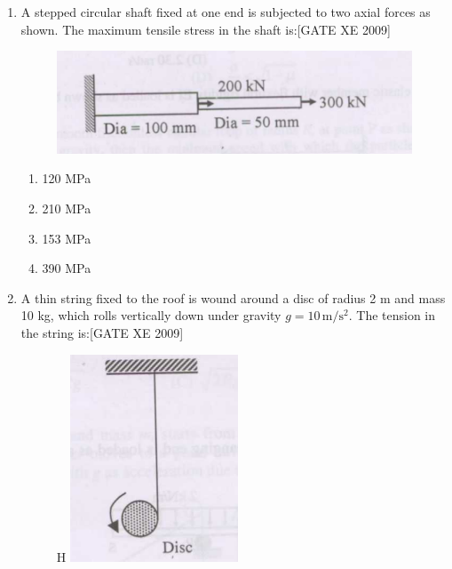 \documentclass[journal,12pt,onecolumn]{IEEEtran}
\theoremstyle{remark}
\begin{document}
\begin{enumerate}
\item A stepped circular shaft fixed at one end is subjected to two axial forces as shown. The maximum tensile stress in the shaft is:\hfill[GATE XE 2009]

\begin{figure}[H]
    \centering
    \includegraphics[width=0.5\linewidth]{figs/fig18.png}
    \caption*{}
    \label{fig:Q 77}
\end{figure}
   

\begin{multicols}{2}
\begin{enumerate}
    \item 120 MPa
    \item 210 MPa
    \item 153 MPa
    \item 390 MPa
\end{enumerate}
\end{multicols}



\item A thin string fixed to the roof is wound around a disc of radius 2 m and mass 10 kg, which rolls vertically down under gravity $g=10\,\mathrm{m/s^2}$. The tension in the string is:\hfill[GATE XE 2009]


   \begin{figure}{H}
       \centering
       \includegraphics[width=0.5\linewidth]{figs/fig19.png}
       \caption*{}
       \label{fig:Q 78}
   \end{figure}
    


\end{enumerate}
\end{document}
